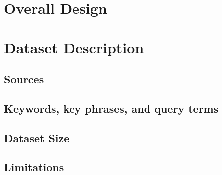 \documentclass{report}
\begin{document}
\section{Overall Design}



\section{Dataset Description}  %

\subsection{Sources}


\subsection{Keywords, key phrases, and query terms}



\subsection{Dataset Size}


\subsection{Limitations}

\end{document}
